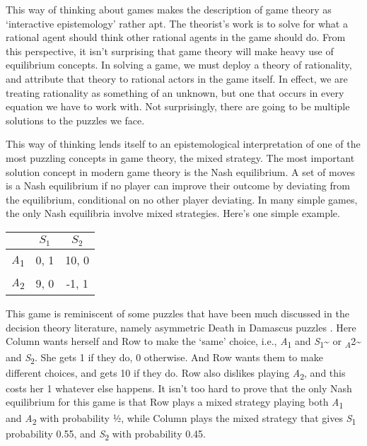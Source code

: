 \documentclass[
  11pt,
]{book}
\begin{document}
This way of thinking about games makes the description of game theory as `interactive epistemology' \citep{Aumann1999} rather apt. The theorist's work is to solve for what a rational agent should think other rational agents in the game should do. From this perspective, it isn't surprising that game theory will make heavy use of equilibrium concepts. In solving a game, we must deploy a theory of rationality, and attribute that theory to rational actors in the game itself. In effect, we are treating rationality as something of an unknown, but one that occurs in every equation we have to work with. Not surprisingly, there are going to be multiple solutions to the puzzles we face.

This way of thinking lends itself to an epistemological interpretation of one of the most puzzling concepts in game theory, the mixed strategy. The most important solution concept in modern game theory is the Nash equilibrium. A set of moves is a Nash equilibrium if no player can improve their outcome by deviating from the equilibrium, conditional on no other player deviating. In many simple games, the only Nash equilibria involve mixed strategies. Here's one simple example.

\begin{longtable}[]{@{}lcc@{}}
\toprule()
& \(S_1\) & \(S_2\) \\
\midrule()
\endhead
\emph{A}\textsubscript{1} & 0, 1 & 10, 0 \\
\emph{A}\textsubscript{2} & 9, 0 & -1, 1 \\
\bottomrule()
\end{longtable}

This game is reminiscent of some puzzles that have been much discussed in the decision theory literature, namely asymmetric Death in Damascus puzzles \citep{Richter1984} . Here Column wants herself and Row to make the `same' choice, i.e., \emph{A}\textsubscript{1} and \emph{S}\textsubscript{1}\textasciitilde{} or \textsubscript{\emph{A}}2\textasciitilde{} and \emph{S}\textsubscript{2}. She gets 1 if they do, 0 otherwise. And Row wants them to make different choices, and gets 10 if they do. Row also dislikes playing \emph{A}\textsubscript{2}, and this costs her 1 whatever else happens. It isn't too hard to prove that the only Nash equilibrium for this game is that Row plays a mixed strategy playing both \emph{A}\textsubscript{1} and \emph{A}\textsubscript{2} with probability ½, while Column plays the mixed strategy that gives \emph{S}\textsubscript{1} probability 0.55, and \emph{S}\textsubscript{2} with probability 0.45.
\end{document}
